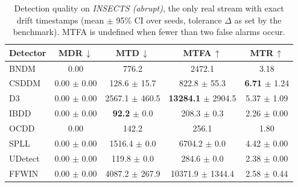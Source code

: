\begin{table}[!t]
\centering
\caption{Detection quality on \textit{INSECTS (abrupt)}, the only real stream with exact drift timestamps (mean $\pm$ 95\% CI over seeds, tolerance $\Delta$ as set by the benchmark). MTFA is undefined when fewer than two false alarms occur.}
\label{tab:insects_gt}
\footnotesize
\setlength{\tabcolsep}{5pt}
\begin{tabular}{@{}lcccc@{}}
\toprule
\textbf{Detector} & \textbf{MDR}\,$\downarrow$ & \textbf{MTD}\,$\downarrow$ & \textbf{MTFA}\,$\uparrow$ & \textbf{MTR}\,$\uparrow$ \\
\midrule
BNDM & 0.00 & 776.2 & 2472.1 & 3.18 \\
CSDDM & 0.00 $\pm$ 0.00 & 128.6 $\pm$ 15.7 & 822.8 $\pm$ 55.3 & \textbf{6.71} $\pm$ 1.24 \\
D3 & 0.00 $\pm$ 0.00 & 2567.1 $\pm$ 460.5 & \textbf{13284.1} $\pm$ 2904.5 & 5.37 $\pm$ 1.09 \\
IBDD & 0.00 $\pm$ 0.00 & \textbf{92.2} $\pm$ 0.0 & 208.3 $\pm$ 0.3 & 2.26 $\pm$ 0.00 \\
OCDD & 0.00 & 142.2 & 256.1 & 1.80 \\
SPLL & 0.00 $\pm$ 0.00 & 1516.4 $\pm$ 0.0 & 6704.2 $\pm$ 0.0 & 4.42 $\pm$ 0.00 \\
UDetect & 0.00 $\pm$ 0.00 & 119.8 $\pm$ 0.0 & 284.6 $\pm$ 0.0 & 2.38 $\pm$ 0.00 \\
FFWIN & 0.00 $\pm$ 0.00 & 4087.2 $\pm$ 267.9 & 10371.9 $\pm$ 1344.4 & 2.58 $\pm$ 0.44 \\
\bottomrule
\end{tabular}
\end{table}
